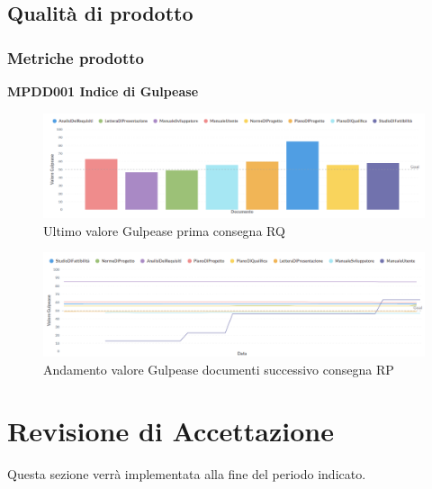 \documentclass[PianoDiQualifica.tex]{subfiles}
\begin{document}
\newpage
\subsection{Qualità di prodotto}

\subsubsection{Metriche prodotto}

\textbf{MPDD001 Indice di Gulpease}
\begin{figure}[htbp]
	\centering
	\includegraphics[width=1\linewidth]{RQ/gulpease}
	\caption{Ultimo valore Gulpease prima consegna RQ}
	\label{fig:processi}
\end{figure}

\begin{figure}[htbp]
	\centering
	\includegraphics[width=1\linewidth]{RQ/gulpeasegrid}
	\caption{Andamento valore Gulpease documenti successivo consegna RP}
	\label{fig:processi}
\end{figure}

\section{Revisione di Accettazione}
Questa sezione verrà implementata alla fine del periodo indicato.
\end{document}

